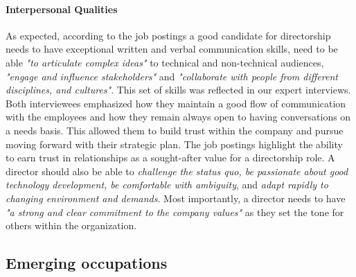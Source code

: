 \documentclass[sigconf]{acmart}
\begin{document}
\paragraph{Interpersonal Qualities}
As expected, according to the job postings a good candidate for directorship needs to have exceptional written and verbal communication skills, need to be able \textit{"to articulate complex ideas"} to technical and non-technical audiences, \textit{"engage and influence stakeholders"} and \textit{"collaborate with people from different disciplines, and cultures"}. This set of skills was reflected in our expert interviews. Both interviewees emphasized how they maintain a good flow of communication with the employees and how they remain always open to having conversations on a needs basis. This allowed them to build trust within the company and pursue moving forward with their strategic plan. The job postings highlight the ability to earn trust in relationships as a sought-after value for a directorship role. A director should also be able to \textit{challenge the status quo, be passionate about good technology development, be comfortable with ambiguity}, and \textit{adapt rapidly to changing environment and demands}. Most importantly, a director needs to have \textit{"a strong and clear commitment to the company values"} as they set the tone for others within the organization. 
%
\subsection{Emerging occupations}
\end{document}
